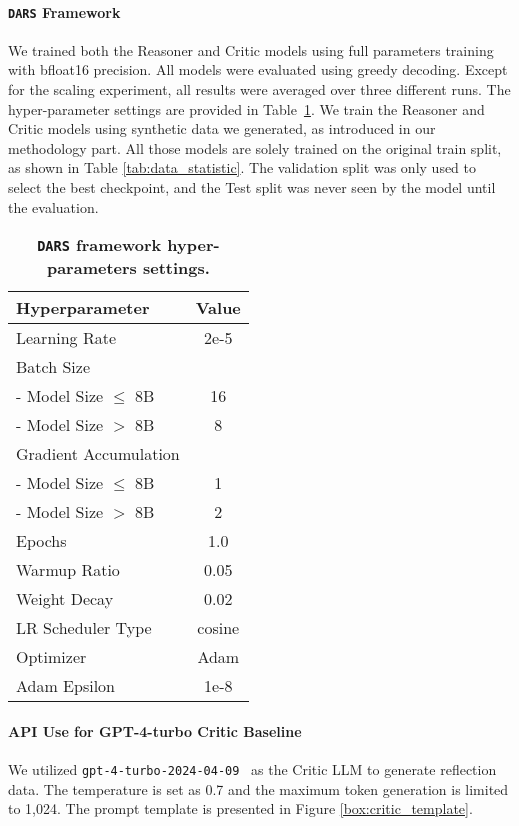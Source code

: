 \paragraph{\texttt{DARS} Framework} We trained both the Reasoner and Critic models using full parameters training with bfloat16 precision. All models were evaluated using greedy decoding. Except for the scaling experiment, all results were averaged over three different runs. The hyper-parameter settings are provided in Table~\ref{tab:hyperparameters_ours}. We train the Reasoner and Critic models using synthetic data we generated, as introduced in our methodology part. All those models are solely trained on the original train split, as shown in Table \ref{tab:data_statistic}. The validation split was only used to select the best checkpoint, and the Test split was never seen by the model until the evaluation.

\begin{table}[h]
\small
\centering
\begin{tabular}{|l|c|}
\hline
\textbf{Hyperparameter} & \textbf{Value} \\
\hline
Learning Rate          & 2e-5      \\
Batch Size             &           \\
- Model Size $\leq$ 8B & 16        \\
- Model Size $>$ 8B    & 8         \\
Gradient Accumulation  &           \\
- Model Size $\leq$ 8B & 1         \\
- Model Size $>$ 8B    & 2         \\
Epochs                 & 1.0       \\
Warmup Ratio           & 0.05      \\
Weight Decay           & 0.02      \\
LR Scheduler Type      & cosine    \\
Optimizer              & Adam      \\
Adam Epsilon           & 1e-8      \\
\hline
\end{tabular}
\caption{\small\textbf{\texttt{DARS} framework hyper-parameters settings.}}
\label{tab:hyperparameters_ours}
\end{table}

\paragraph{API Use for GPT-4-turbo Critic Baseline} We utilized \texttt{gpt-4-turbo-2024-04-09}~\cite{gpt4} as the Critic LLM to generate reflection data. The temperature is set as 0.7 and the maximum token generation is limited to 1,024. The prompt template is presented in Figure \ref{box:critic_template}.

